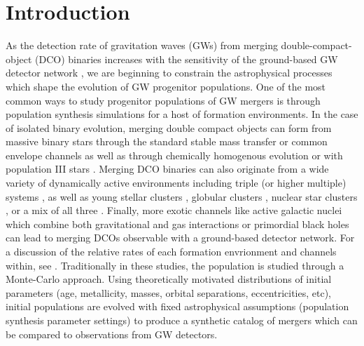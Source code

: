 \documentclass[twocolumn]{aastex631}
\begin{document}
\section{Introduction}
As the detection rate of gravitation waves (GWs) from merging
double-compact-object (DCO) binaries increases with the sensitivity of the
ground-based GW detector network
\citep{Abbott2018,LIGOScientificCollaboration2015,Buikema2020,Tse2019,Acernese2015,Acernese2019,Aso2013,Akutsu2021},
we are beginning to constrain the astrophysical processes which shape the
evolution of GW progenitor populations. One of the most common ways to study
progenitor populations of GW mergers is through population synthesis simulations
for a host of formation environments. In the case of isolated binary evolution, merging 
double compact objects can form from massive binary stars through the
standard stable mass transfer or common envelope channels 
\citep[e.g.][]{Belczynski2002, Dominik2012, Belczynski2016, Zevin2020, Bavera2021, Broekgaarden2021, VanSon2022} 
as well as through chemically homogenous evolution \citep{Mandel2016, Marchant2016, deMink2016} 
or with population III stars \citep[e.g.][]{Belczynski2004, Kinugawa2014, Inayoshi2016, Inayoshi2017, Tanikawa2021, Tanikawa2022}.
Merging DCO binaries can also originate from a wide variety of dynamically active environments including 
triple (or higher multiple) systems \citep[e.g.][]{Antonini2017, Silsbee2017, Fragione2019, VignaGomez2021}, 
as well as young stellar clusters \citep[e.g.][]{Ziosi2014, Banerjee2017, DiCarlo2020, Chattopadhyay2022}, 
globular clusters \citep[e.g.][]{PortegiesZwart2000, OLeary2006, Downing2010, Samsing2014, Rodriguez2015, Rodriguez2016, Askar2017, Rodriguez2019}, 
nuclear star clusters \citep[][]{Miller2009, Antonini2016}, or a mix of all three \citep[e.g.][]{Mapelli2022}.
Finally, more exotic channels like active galactic nuclei which combine both gravitational and gas interactions 
\citep[e.g.][]{McKernan2018, McKernan2020, Secunda2020, Ford2021} or primordial black holes \citep[e.g.][]{Bird2016, AliHaimoud2017} can lead 
to merging DCOs observable with a ground-based detector network. For a discussion of the relative rates of each 
formation envrionment and channels within, see \citet{Mandel2022}. Traditionally in these studies, the
population is studied through a Monte-Carlo approach.  Using theoretically
motivated distributions of initial parameters (age, metallicity, masses, orbital
separations, eccentricities, etc), initial populations are evolved with fixed
astrophysical assumptions (population synthesis parameter settings) to produce a
synthetic catalog of mergers which can be compared to observations from
GW detectors.
\end{document}
